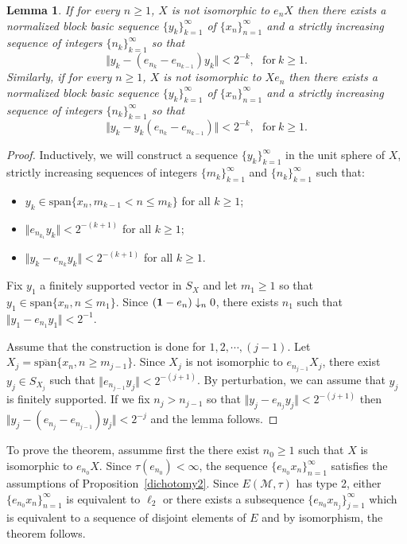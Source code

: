 \documentclass[12pt]{amsart}
\let\cal\mathcal
\newtheorem{lemma}[theorem]{Lemma}
\def\m{{\cal M}}
\numberwithin{equation}{section}
\numberwithin{theorem}{section}
\begin{document}
\begin{lemma}
If for every $n\geq 1$, $X$ is not isomorphic to $e_nX$ then 
there exists a normalized block basic sequence $\{y_k\}_{k=1}^\infty$ of 
$\{x_n\}_{n=1}^\infty$ and
a strictly  increasing sequence of integers $\{n_k\}_{k=1}^\infty$ so that
$$\Vert y_k -(e_{n_k}-e_{n_{k-1}})y_k \Vert<2^{-k},\ \ \ \text{for}\ 
k\geq 1.$$
Similarly, if for every $n\geq 1$, $X$ is not isomorphic to $Xe_n$ then 
there exists a normalized block basic sequence $\{y_k\}_{k=1}^\infty$ of 
$\{x_n\}_{n=1}^\infty$ and
a strictly increasing sequence of integers $\{n_k\}_{k=1}^\infty$ so that
$$ \Vert y_k -y_k(e_{n_k}-e_{n_{k-1}}) \Vert <2^{-k},\ \ \ \text{for}\ 
k\geq 1.$$ 
\end{lemma}
\begin{proof}
Inductively, we will construct a sequence $\{y_k\}_{k=1}^\infty$ in the unit sphere
of $X$, strictly increasing sequences of integers 
$\{m_k\}_{k=1}^\infty$ and $\{n_k\}_{k=1}^\infty$  such
that:
\begin{itemize}
\item[(i)] $y_k \in \text{span}\{x_n, m_{k-1}<n \leq m_k\}$ for all 
$k \geq 1$;
\item[(ii)] $\Vert e_{n_{k_1}}y_k \Vert < 2^{-(k+1)}$ for all $k \geq 1$;
\item[(iii)] $\Vert y_k - e_{n_{k}}y_k \Vert < 2^{-(k+1)}$ for all $k \geq 1$.
\end{itemize}
Fix $y_1$ a finitely supported vector in $S_X$ and let $m_1 \geq 1$ so that
$y_1 \in \text{span}\{x_n, n \leq m_1\}$. Since 
$({\bf 1}- e_{n}) \downarrow_n 0$, there exists $n_1$ such that 
$\Vert y_1 -e_{n_1}y_1 \Vert <2^{-1}$.

Assume that the construction is done for $1, 2, \cdots, (j-1)$. Let
$X_j=\overline{\text{span}}\{x_n, n \geq m_{j-1}\}$. Since $X_j$ is not
isomorphic to $e_{n_{j-1}}X_j$, there exist $y_j \in S_{X_j}$ such that
$\Vert e_{n_{j-1}}y_j\Vert < 2^{-(j+1)}$. 
By perturbation, we can assume that $y_j$ is finitely supported. If we fix
$n_j> n_{j-1}$ so that $\Vert y_j - e_{n_j}y_j\Vert < 2^{-(j+1)}$ then
$\Vert y_j - (e_{n_j}- e_{n_{j-1}})y_j\Vert < 2^{-j}$ and the lemma follows.
\end{proof}

To prove the theorem, assumme first the there exist $n_0 \geq 1$ such that
$X$ is isomorphic to $e_{n_0}X$. Since $\tau(e_{n_0})<\infty$, the sequence 
$\{e_{n_0}x_n\}_{n=1}^\infty$ satisfies the assumptions of 
Proposition~\ref{dichotomy2}. Since
 $E(\m,\tau)$ has type 2, either $\{e_{n_0}x_n\}_{n=1}^\infty$ is equivalent to $\ell_2$
or there exists a subsequence $\{e_{n_0}x_{n_j}\}_{j=1}^\infty$  which is equivalent 
to a sequence of disjoint elements of $E$ and by isomorphism, the theorem follows.
\end{document}
